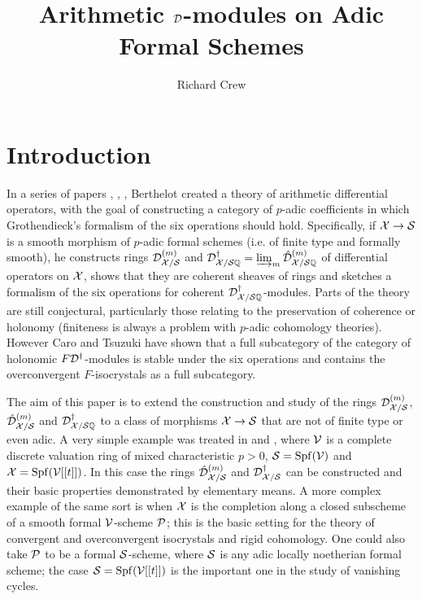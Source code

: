 \documentclass{article}
\title{Arithmetic ${\cal D}$-modules on Adic Formal Schemes}
\author{Richard Crew}
\theoremstyle{change}
\numberwithin{equation}{subsubsection}
\begin{document}
\maketitle

\section*{Introduction}
\label{sec:intro}

In a series of papers \cite{berthelot:1990}, \cite{berthelot:1996},
\cite{berthelot:2000}, \cite{berthelot:2002} Berthelot created a
theory of arithmetic differential operators, with the goal of
constructing a category of $p$-adic coefficients in which
Grothendieck's formalism of the six operations should
hold. Specifically, if ${\cal X}\to{\cal S}$ is a smooth morphism of $p$-adic
formal schemes (i.e. of finite type and formally smooth), he
constructs rings ${{\cal D}}^{({m})}_{{\cal X}/{\cal S}}$ and
${\cal D}^\dagger_{{\cal X}/{\cal S}{\mathbb Q}}=\varinjlim_m{\hat{\cal D}}^{({m})}_{{\cal X}/{\cal S}{\mathbb Q}}$ of differential
operators on ${\cal X}$, shows that they are coherent sheaves of rings and
sketches a formalism of the six operations for coherent
${\cal D}^\dagger_{{\cal X}/{\cal S}{\mathbb Q}}$-modules. Parts of the theory are still
conjectural, particularly those relating to the preservation of
coherence or holonomy (finiteness is always a problem with $p$-adic
cohomology theories). However Caro and Tsuzuki have shown
\cite{caro-tsuzuki:2012} that a full subcategory of the category of
holonomic $F{\cal D}^\dagger$-modules is stable under the six operations and
contains the overconvergent $F$-isocrystals as a full subcategory.

The aim of this paper is to extend the construction and study of the
rings ${{\cal D}}^{({m})}_{{\cal X}/{\cal S}}$, ${\hat{\cal D}}^{({m})}_{{\cal X}/{\cal S}}$ and
${\cal D}^\dagger_{{\cal X}/{\cal S}{\mathbb Q}}$ to a class of morphisms ${\cal X}\to{\cal S}$ that are not
of finite type or even adic. A very simple example was treated in
\cite{crew:2006} and \cite{crew:2012}, where ${\cal V}$ is a complete
discrete valuation ring of mixed characteristic $p>0$, ${\cal S}={\operatorname{Spf}({{\cal V}})}$
and ${\cal X}={\operatorname{Spf}({{\cal V}[[t]]})}$. In this case the rings
${\hat{\cal D}}^{({m})}_{{\cal X}/{\cal S}}$ and ${\cal D}^\dagger_{{\cal X}/{\cal S}}$ can be constructed and
their basic properties demonstrated by elementary means. A more
complex example of the same sort is when ${\cal X}$ is the completion along
a closed subscheme of a smooth formal ${\cal V}$-scheme ${\cal P}$; this is the
basic setting for the theory of convergent and overconvergent
isocrystals and rigid cohomology. One could also take ${\cal P}$ to be a
formal ${\cal S}$-scheme, where ${\cal S}$ is any adic locally noetherian formal
scheme; the case ${\cal S}={\operatorname{Spf}({{\cal V}[[t]]})}$ is the important one in the study
of vanishing cycles.
\end{document}

